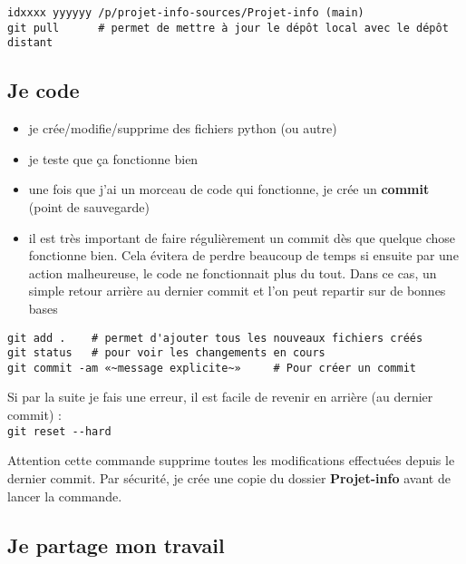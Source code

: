 \documentclass[11pt]{article}
\begin{document}
\noindent
\verb"idxxxx yyyyyy /p/projet-info-sources/Projet-info (main)" \\
\verb"git pull      # permet de mettre à jour le dépôt local avec le dépôt distant"




\subsection*{Je code}

\begin{itemize}
    \item je crée/modifie/supprime des fichiers python (ou autre)
    \item je teste que ça fonctionne bien
    \item une fois que j'ai un morceau de code qui fonctionne, je crée un \textbf{commit} (point de sauvegarde)
    \item il est très important de faire régulièrement un commit dès que quelque chose fonctionne bien. Cela évitera de perdre beaucoup de temps si ensuite par une action malheureuse, le code ne fonctionnait plus du tout. Dans ce cas, un simple retour arrière au dernier commit et l'on peut repartir sur de bonnes bases
\end{itemize}

\noindent
\verb"git add .    # permet d'ajouter tous les nouveaux fichiers créés" \\
\verb"git status   # pour voir les changements en cours" \\
\verb"git commit -am «~message explicite~»     # Pour créer un commit" \\

\bigbreak

Si par la suite je fais une erreur, il est facile de revenir en arrière (au dernier commit) :\\
\verb"git reset --hard" 

\bigbreak

Attention cette commande supprime toutes les modifications effectuées depuis le dernier commit. Par sécurité, je crée une copie du dossier \textbf{Projet-info} avant de lancer la commande.



\subsection*{Je partage mon travail}
\end{document}
